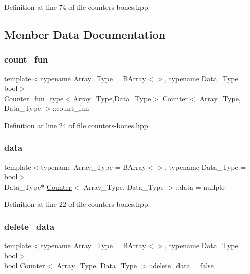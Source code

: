 Definition at line 74 of file counters-\/bones.\+hpp.



\subsection{Member Data Documentation}
\mbox{\label{class_counter_a804d287379ef9b4204a0838edcce3b71}} 
\subsubsection{\texorpdfstring{count\+\_\+fun}{count\_fun}}
{\footnotesize\ttfamily template$<$typename Array\+\_\+\+Type = B\+Array$<$$>$, typename Data\+\_\+\+Type = bool$>$ \\
\hyperlink{typedefs_8hpp_ac0160f52f564dea3ac033b374cffbfe7}{Counter\+\_\+fun\+\_\+type}$<$Array\+\_\+\+Type,Data\+\_\+\+Type$>$ \hyperlink{class_counter}{Counter}$<$ Array\+\_\+\+Type, Data\+\_\+\+Type $>$\+::count\+\_\+fun}



Definition at line 24 of file counters-\/bones.\+hpp.

\mbox{\label{class_counter_a9ebfed99a67888f80c19cabc4098bdd0}} 
\subsubsection{\texorpdfstring{data}{data}}
{\footnotesize\ttfamily template$<$typename Array\+\_\+\+Type = B\+Array$<$$>$, typename Data\+\_\+\+Type = bool$>$ \\
Data\+\_\+\+Type$\ast$ \hyperlink{class_counter}{Counter}$<$ Array\+\_\+\+Type, Data\+\_\+\+Type $>$\+::data = nullptr}



Definition at line 22 of file counters-\/bones.\+hpp.

\mbox{\label{class_counter_a5190fbe81aac2426ac36c0a088e242e7}} 
\subsubsection{\texorpdfstring{delete\+\_\+data}{delete\_data}}
{\footnotesize\ttfamily template$<$typename Array\+\_\+\+Type = B\+Array$<$$>$, typename Data\+\_\+\+Type = bool$>$ \\
bool \hyperlink{class_counter}{Counter}$<$ Array\+\_\+\+Type, Data\+\_\+\+Type $>$\+::delete\+\_\+data = false}



